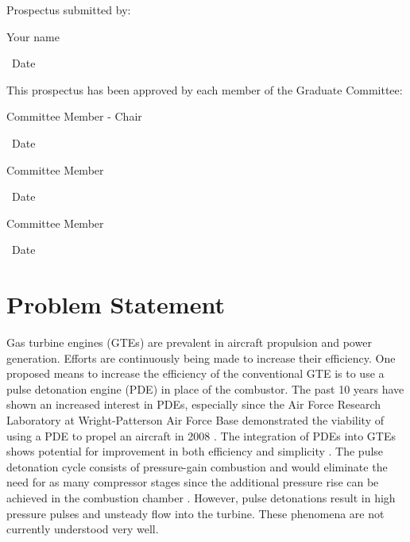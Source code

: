 \documentclass[12pt, letterpaper]{article}
\begin{document}
\hspace*{.47in}
\begin{minipage}[c]{5.25in}

\normalsize

Prospectus submitted by:

\vspace{.5in}

\makebox[2in]{\hrulefill} \hspace{1in} \makebox[2in]{\hrulefill}

\parbox[b]{3in}{Your name} \, Date
\vspace{0.5in}

This prospectus has been approved by each member of the Graduate Committee:
\vspace{0.5in}

\makebox[2in]{\hrulefill} \hspace{1in} \makebox[2in]{\hrulefill}

\parbox[b]{3in}{Committee Member - Chair} \, Date
\vspace{0.4in}

\makebox[2in]{\hrulefill} \hspace{1in} \makebox[2in]{\hrulefill}

\parbox[b]{3in}{Committee Member} \, Date
\vspace{0.4in}

\makebox[2in]{\hrulefill} \hspace{1in} \makebox[2in]{\hrulefill}

\parbox[b]{3in}{Committee Member} \, Date

\end{minipage}

\vspace*{\fill}

\pagebreak

\setcounter{page}{1}

\section{Problem Statement}

Gas turbine engines (GTEs) are prevalent in aircraft propulsion and power generation. Efforts are continuously being made to increase their efficiency. One proposed means to increase the efficiency of the conventional GTE is to use a pulse detonation engine (PDE) in place of the combustor. The past 10 years have shown an increased interest in PDEs, especially since the Air Force Research Laboratory at Wright-Patterson Air Force Base demonstrated the viability of using a PDE to propel an aircraft in 2008 \cite{Barr2008}. The integration of PDEs into GTEs shows potential for improvement in both efficiency \cite{Rasheed2011:Experimental} and simplicity \cite{Povinelli2002:PulseDetonation, Hutchins2003:EnergyandExergy}. The pulse detonation cycle consists of pressure-gain combustion and would eliminate the need for as many compressor stages since the additional pressure rise can be achieved in the combustion chamber \cite{Glaser2007:Performance, Hofer2009:Performance}. However, pulse detonations result in high pressure pulses and unsteady flow into the turbine. These phenomena are not currently understood very well.
\end{document}
